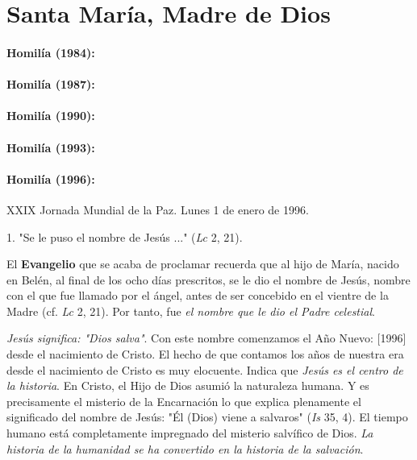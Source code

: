 \chapter{Santa María, Madre de Dios}

\subsubsection{Homilía (1984): }

\subsubsection{Homilía (1987): }

\subsubsection{Homilía (1990): }

\subsubsection{Homilía (1993): }

\subsubsection{Homilía (1996): }

XXIX Jornada Mundial de la Paz. Lunes 1 de enero de 1996.

1. "Se le puso el nombre de Jesús ..." (\emph{Lc} 2, 21).

El \textbf{Evangelio} que se acaba de proclamar recuerda que al hijo de
María, nacido en Belén, al final de los ocho días prescritos, se le dio
el nombre de Jesús, nombre con el que fue llamado por el ángel, antes de
ser concebido en el vientre de la Madre (cf. \emph{Lc} 2, 21). Por
tanto, fue \emph{el nombre que le dio el Padre celestial}.

\emph{Jesús significa: "Dios salva"}. Con este nombre comenzamos el Año
Nuevo: {[}1996{]} desde el nacimiento de Cristo. El hecho de que
contamos los años de nuestra era desde el nacimiento de Cristo es muy
elocuente. Indica que \emph{Jesús es el centro de la historia}. En
Cristo, el Hijo de Dios asumió la naturaleza humana. Y es precisamente
el misterio de la Encarnación lo que explica plenamente el significado
del nombre de Jesús: "Él (Dios) viene a salvaros" (\emph{Is} 35, 4). El
tiempo humano está completamente impregnado del misterio salvífico de
Dios. \emph{La historia de la humanidad se ha convertido en la historia
	de la salvación}.

